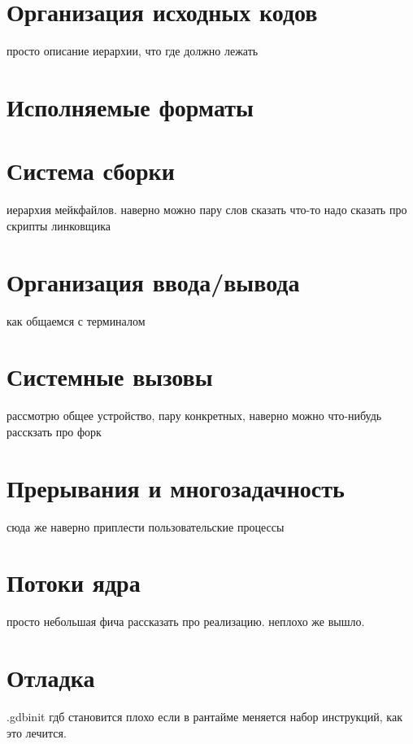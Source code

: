 \section{Организация исходных кодов}
просто описание иерархии, что где должно лежать

\section{Исполняемые форматы}

\section{Система сборки}
иерархия мейкфайлов. наверно можно пару слов сказать
что-то надо сказать про скрипты линковщика

\section{Организация ввода/вывода}
как общаемся с терминалом

\section{Системные вызовы}
рассмотрю общее устройство, пару конкретных, наверно можно что-нибудь расскзать про форк

\section{Прерывания и многозадачность}
сюда же наверно приплести пользовательские процессы

\section{Потоки ядра}
просто небольшая фича рассказать про реализацию. неплохо же вышло.

\section{Отладка}
.gdbinit
гдб становится плохо если в рантайме меняется набор инструкций, как это лечится.
